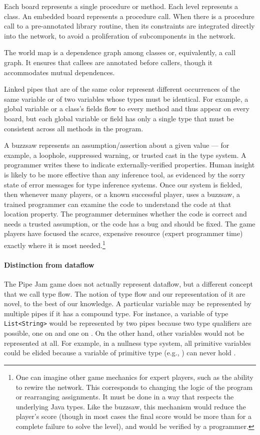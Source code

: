 \documentclass[preprint]{sig-alternate}
\def\<#1>{\codeid{#1}}
\newcommand{\codeid}[1]{\ifmmode{\mbox{\ttfamily{#1}}}\else{\ttfamily #1}\fi}
\begin{document}
Each board represents a single procedure or method.  Each level
represents a class.  An embedded board represents a procedure call.
When there is a procedure call to a pre-annotated library routine,
then its constraints are integrated directly into the network, to
avoid a proliferation of subcomponents in the network.

The world map is a dependence graph among classes or, equivalently, a
call graph.  It ensures that callees are annotated before callers,
though it accommodates mutual dependences.

Linked pipes that are of the same color represent different
occurrences of the same variable or of two variables whose types must
be identical.  For example, a global variable or a class's fields flow
to every method and thus appear on every board, but each global
variable or field has only a single type that must be consistent
across all methods in the program.

A buzzsaw represents an assumption/assertion about a given value --- for
example, a loophole, suppressed warning, or trusted cast in the type
system.  A programmer writes these to indicate externally-verified
properties.  Human insight is likely to be
more effective than any inference tool, as evidenced by the sorry
state of error messages for type inference systems.  Once our system is
fielded, then whenever many
players, or a known successful player, uses a buzzsaw, a trained
programmer can examine the code to understand the code at that
location property.  The programmer determines whether the code is
correct and needs a trusted assumption, or the code has a bug and
should be fixed.  The game players have focused the scarce, expensive
resource (expert programmer time) exactly where it is most
needed.\footnote{One can imagine other game mechanics for expert
  players, such as the ability to rewire the network.  This
  corresponds to changing the logic of the program or rearranging
  assignments.  It must be done in a way that respects the underlying
  Java types.  Like the buzzsaw, this mechanism would reduce the
  player's score (though in most cases the final score would be more
  than for a complete failure to solve the level), and would be
  verified by a programmer.}


\paragraph{Distinction from dataflow}
The Pipe Jam game does not actually represent dataflow, but a
different concept that we call type flow.  The notion of type flow and our
representation of it are
novel, to the best of our knowledge.  A particular variable may be
represented by multiple pipes if it has a compound type.  For
instance, a variable of type \verb|List<String>| would be represented
by two pipes because two type qualifiers are possible, one on \<List>
and one on \<String>.  On the other hand, other variables would not be
represented at all.  For example, in a nullness type system, all
primitive variables could be elided because a variable of primitive
type (e.g., \<int>) can never hold \<null>.
\end{document}
